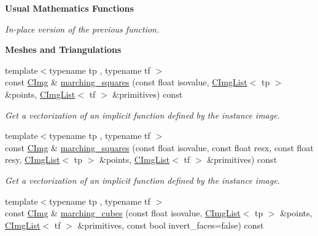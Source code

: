 \begin{Indent}{\bf Usual Mathematics Functions}
\begin{DoxyCompactItemize}
\begin{DoxyCompactList}\small\item\em In-\/place version of the previous function. \end{DoxyCompactList}\end{DoxyCompactItemize}
\end{Indent}
\begin{Indent}{\bf Meshes and Triangulations}\par
\begin{DoxyCompactItemize}
\item 
\hypertarget{structcimg__library_1_1_c_img_a4a8d0d44178a57ca3146405a10ab7f7b}{{\footnotesize template$<$typename tp , typename tf $>$ }\\const \hyperlink{structcimg__library_1_1_c_img}{C\-Img} \& \hyperlink{structcimg__library_1_1_c_img_a4a8d0d44178a57ca3146405a10ab7f7b}{marching\-\_\-squares} (const float isovalue, \hyperlink{structcimg__library_1_1_c_img_list}{C\-Img\-List}$<$ tp $>$ \&points, \hyperlink{structcimg__library_1_1_c_img_list}{C\-Img\-List}$<$ tf $>$ \&primitives) const }\label{structcimg__library_1_1_c_img_a4a8d0d44178a57ca3146405a10ab7f7b}

\begin{DoxyCompactList}\small\item\em Get a vectorization of an implicit function defined by the instance image. \end{DoxyCompactList}\item 
{\footnotesize template$<$typename tp , typename tf $>$ }\\const \hyperlink{structcimg__library_1_1_c_img}{C\-Img} \& \hyperlink{structcimg__library_1_1_c_img_af9f96ed4287a9536ece98e0947f44a15}{marching\-\_\-squares} (const float isovalue, const float resx, const float resy, \hyperlink{structcimg__library_1_1_c_img_list}{C\-Img\-List}$<$ tp $>$ \&points, \hyperlink{structcimg__library_1_1_c_img_list}{C\-Img\-List}$<$ tf $>$ \&primitives) const 
\begin{DoxyCompactList}\small\item\em Get a vectorization of an implicit function defined by the instance image. \end{DoxyCompactList}\item 
\hypertarget{structcimg__library_1_1_c_img_a73dc80c05a06a996ad49bf878036c5cb}{{\footnotesize template$<$typename tp , typename tf $>$ }\\const \hyperlink{structcimg__library_1_1_c_img}{C\-Img} \& \hyperlink{structcimg__library_1_1_c_img_a73dc80c05a06a996ad49bf878036c5cb}{marching\-\_\-cubes} (const float isovalue, \hyperlink{structcimg__library_1_1_c_img_list}{C\-Img\-List}$<$ tp $>$ \&points, \hyperlink{structcimg__library_1_1_c_img_list}{C\-Img\-List}$<$ tf $>$ \&primitives, const bool invert\-\_\-faces=false) const }\label{structcimg__library_1_1_c_img_a73dc80c05a06a996ad49bf878036c5cb}


\end{DoxyCompactItemize}
\end{Indent}
